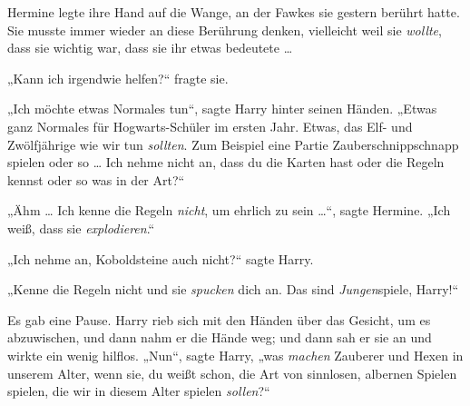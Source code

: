 Hermine legte ihre Hand auf die Wange, an der Fawkes sie gestern berührt hatte. Sie musste immer wieder an diese Berührung denken, vielleicht weil sie \emph{wollte}, dass sie wichtig war, dass sie ihr etwas bedeutete …

„Kann ich irgendwie helfen?“ fragte sie.

„Ich möchte etwas Normales tun“, sagte Harry hinter seinen Händen.
„Etwas ganz Normales für Hogwarts-Schüler im ersten Jahr. Etwas, das Elf- und Zwölfjährige wie wir tun \emph{sollten}. Zum Beispiel eine Partie Zauberschnippschnapp spielen oder so … Ich nehme nicht an, dass du die Karten hast oder die Regeln kennst oder so was in der Art?“

„Ähm … Ich kenne die Regeln \emph{nicht}, um ehrlich zu sein …“, sagte Hermine.
„Ich weiß, dass sie \emph{explodieren}.“

„Ich nehme an, Koboldsteine auch nicht?“ sagte Harry.

„Kenne die Regeln nicht und sie \emph{spucken} dich an. Das sind \emph{Jungen}{}spiele, Harry!“

Es gab eine Pause. Harry rieb sich mit den Händen über das Gesicht, um es abzuwischen, und dann nahm er die Hände weg; und dann sah er sie an und wirkte ein wenig hilflos.
„Nun“, sagte Harry, „was \emph{machen} Zauberer und Hexen in unserem Alter, wenn sie, du weißt schon, die Art von sinnlosen, albernen Spielen spielen, die wir in diesem Alter spielen \emph{sollen}?“

